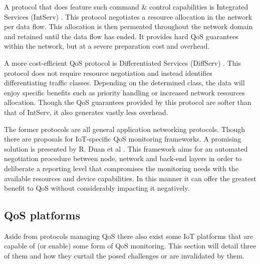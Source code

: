 A protocol that does feature such command \& control capabilities is Integrated Services (IntServ) \cite{intserv_diffserv_uitleg}. This protocol negotiates a resource allocation in the network per data flow. This allocation is then permeated throughout the network domain and retained until the data flow has ended. It provides hard QoS guarantees within the network, but at a severe preparation cost and overhead.

A more cost-efficient QoS protocol is Differentiated Services (DiffServ) \cite{intserv_diffserv_uitleg}. This protocol does not require resource negotiation and instead identifies differentiating traffic classes. Depending on the determined class, the data will enjoy specific benefits such as priority handling or increased network resources allocation. Though the QoS guarantees provided by this protocol are softer than that of IntServ, it also generates vastly less overhead.

The former protocols are all general application networking protocols. Though there are proposals for IoT-specific QoS monitoring frameworks. A promising solution is presented by R. Duan et al \cite{qos_extensive_architecture}. This framework aims for an automated negotiation procedure between node, network and back-end layers in order to deliberate a reporting level that compromises the monitoring needs with the available resources and device capabilities. In this manner it can offer the greatest benefit to QoS without considerably impacting it negatively.

\subsection{QoS platforms}
Aside from protocols managing QoS there also exist some IoT platforms that are capable of (or enable) some form of QoS monitoring. This section will detail three of them and how they curtail the posed challenges or are invalidated by them.
